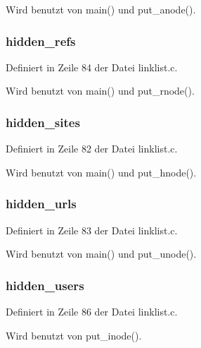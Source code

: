 Wird benutzt von main() und put\_\-anode().
\subsubsection{ {\bf hidden\_\-refs}}\label{linklist_8h_7f8ec975eaff8227a3e09efb17d3e064}




Definiert in Zeile 84 der Datei linklist.c.

Wird benutzt von main() und put\_\-rnode().
\subsubsection{ {\bf hidden\_\-sites}}\label{linklist_8h_96bde86b735761b0b2b03d057d7bddfd}




Definiert in Zeile 82 der Datei linklist.c.

Wird benutzt von main() und put\_\-hnode().
\subsubsection{ {\bf hidden\_\-urls}}\label{linklist_8h_fb86638f144a8726901b06185e2415af}




Definiert in Zeile 83 der Datei linklist.c.

Wird benutzt von main() und put\_\-unode().
\subsubsection{ {\bf hidden\_\-users}}\label{linklist_8h_c328ffff94e0ce5d57817ee1197767aa}




Definiert in Zeile 86 der Datei linklist.c.

Wird benutzt von put\_\-inode().
